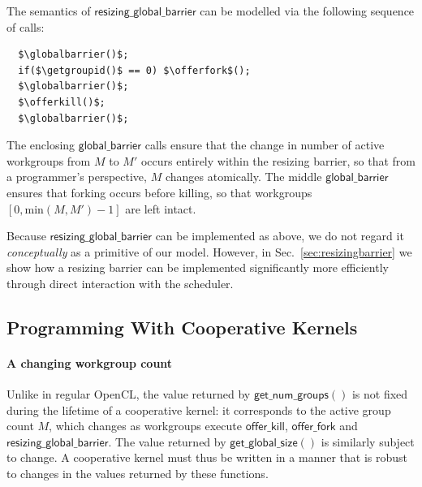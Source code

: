 \documentclass[numbers,nocopyrightspace,10pt]{sigplanconf}
\newcommand{\mysec}{Sec.~}
\newcommand{\offerfork}{\mathsf{offer\_fork}}
\newcommand{\offerkill}{\mathsf{offer\_kill}}
\newcommand{\globalbarrier}{\mathsf{global\_barrier}}
\newcommand{\resizingglobalbarrier}{\mathsf{resizing\_global\_barrier}}
\newcommand{\getgroupid}{\mathsf{get\_group\_id}}
\newcommand{\getnumgroups}{\mathsf{get\_num\_groups}}
\newcommand{\getglobalsize}{\mathsf{get\_global\_size}}
\begin{document}
The semantics of $\resizingglobalbarrier$ can be modelled via the following sequence of calls:

\lstset{basicstyle=\small\tt,numbers=none}
\begin{lstlisting}
  $\globalbarrier()$;
  if($\getgroupid()$ == 0) $\offerfork$();
  $\globalbarrier()$;
  $\offerkill()$;
  $\globalbarrier()$;
\end{lstlisting}
\lstset{basicstyle=\scriptsize\tt,numbers=left}

The enclosing $\globalbarrier$ calls ensure that the change in number
of active workgroups from $M$ to $M'$ occurs entirely within the
resizing barrier, so that from a programmer's perspective, $M$ changes atomically.  The middle $\globalbarrier$ ensures that forking occurs before killing, so that workgroups $[0, \textrm{min}(M, M') - 1]$ are left intact.

Because $\resizingglobalbarrier$ can be implemented as above, we do not regard it \emph{conceptually} as a primitive of our
model.  However, in
\mysec\ref{sec:resizingbarrier} we show how a resizing barrier can be
implemented significantly more efficiently through direct interaction with the scheduler.

\subsection{Programming With Cooperative Kernels}\label{sec:programmingguidelines}


\paragraph{A changing workgroup count}  Unlike in regular OpenCL,
the value returned by $\getnumgroups()$ is not fixed during the
lifetime of a cooperative kernel: it corresponds to the active group count $M$, which changes as workgroups execute
$\offerkill$, $\offerfork$ and $\resizingglobalbarrier$.  The value returned by $\getglobalsize()$
is similarly subject to change.
A cooperative kernel must thus be written in a manner that is
robust to changes in the values returned by these functions.
\end{document}
